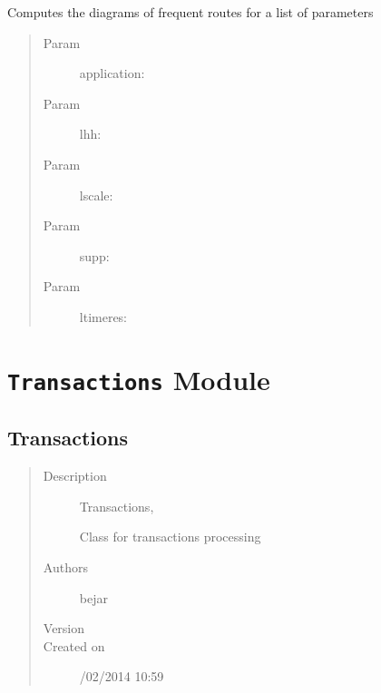 \documentclass[letterpaper,10pt,english]{sphinxmanual}
\begin{document}

\begin{fulllineitems}
\label{index:SuperHub.Routes.transaction_routes_many}
Computes the diagrams of frequent routes for a list of parameters
\begin{quote}\begin{description}
\item[{Param }] \leavevmode
application:

\item[{Param }] \leavevmode
lhh:

\item[{Param }] \leavevmode
lscale:

\item[{Param }] \leavevmode
supp:

\item[{Param }] \leavevmode
ltimeres:

\end{description}\end{quote}

\end{fulllineitems}



\chapter{\texttt{Transactions} Module}
\label{index:module-SuperHub.Transactions}\label{index:transactions-module}\label{index:module-Transactions}

\section{Transactions}
\label{index:transactions}\begin{quote}\begin{description}
\item[{Description}] \leavevmode
Transactions,

Class for transactions processing

\item[{Authors}] \leavevmode
bejar

\item[{Version}] 

\item[{Created on}] /02/2014 10:59

\end{description}\end{quote}
\end{document}
